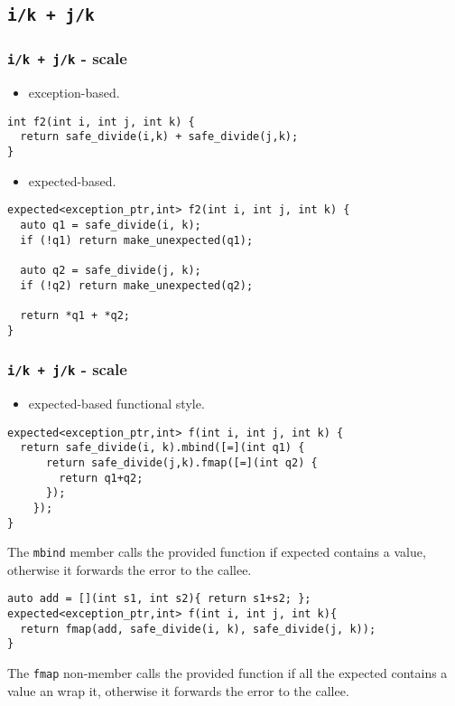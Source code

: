 \documentclass[xcolor=dvipsnames]{beamer}
\newcommand{\cpp}[1]{\lstinline{#1}}
\begin{document}
\subsection{\cpp{i/k + j/k}}
\begin{frame}[fragile]
\frametitle{\cpp{i/k + j/k}  - scale}

\begin{itemize}
  \item exception-based.
\end{itemize}

\begin{lstlisting}
int f2(int i, int j, int k) {
  return safe_divide(i,k) + safe_divide(j,k);
}
\end{lstlisting}

\begin{itemize}
  \item expected-based.
\end{itemize}

\begin{lstlisting}
expected<exception_ptr,int> f2(int i, int j, int k) {
  auto q1 = safe_divide(i, k);
  if (!q1) return make_unexpected(q1);

  auto q2 = safe_divide(j, k);
  if (!q2) return make_unexpected(q2);

  return *q1 + *q2;
}
\end{lstlisting}

\end{frame}
\begin{frame}[fragile]
\frametitle{\cpp{i/k + j/k}  - scale}

\begin{itemize}
  \item expected-based functional style.
\end{itemize}

\begin{lstlisting}
expected<exception_ptr,int> f(int i, int j, int k) {
  return safe_divide(i, k).mbind([=](int q1) {
      return safe_divide(j,k).fmap([=](int q2) {
        return q1+q2;
      });
    });
}
\end{lstlisting}

The \cpp{mbind} member calls the provided function if expected contains a value, otherwise it forwards the error to the callee. 

\begin{lstlisting}
auto add = [](int s1, int s2){ return s1+s2; };
expected<exception_ptr,int> f(int i, int j, int k){
  return fmap(add, safe_divide(i, k), safe_divide(j, k));
}
\end{lstlisting}
The \cpp{fmap} non-member calls the provided function if all the expected contains a value an wrap it, otherwise it forwards the error to the callee. 

\end{frame}
\end{document}
